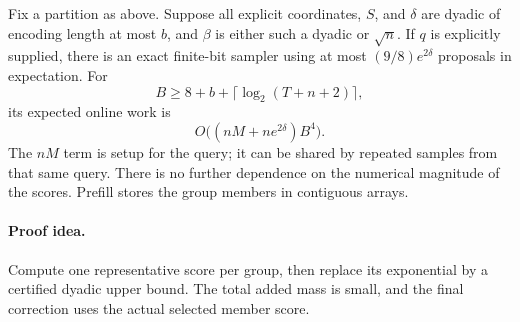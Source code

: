 \begin{theorem}
\label{thm:newexplicitcover}
Fix a partition as above. Suppose all explicit coordinates, $S$,
and $\delta$ are dyadic of encoding length at most $b$, and
$\beta$ is either such a dyadic or $\sqrt n$.
If $q$ is explicitly supplied, there is an exact finite-bit sampler
using at most $(9/8)e^{2\delta}$ proposals in expectation. For
\[
 B\ge 8+b+\lceil\log_2(T+n+2)\rceil,
\]
its expected online work is
\[
 O\bigl((nM+ne^{2\delta})B^4\bigr).
\]
The $nM$ term is setup for the query; it can be shared by repeated
samples from that same query. There is no further dependence on
the numerical magnitude of the scores. Prefill stores the group
members in contiguous arrays.
\end{theorem}
\paragraph{Proof idea.}
Compute one representative score per group, then replace its exponential by a certified dyadic upper bound.  The total added mass is small, and the final correction uses the actual selected member score.

